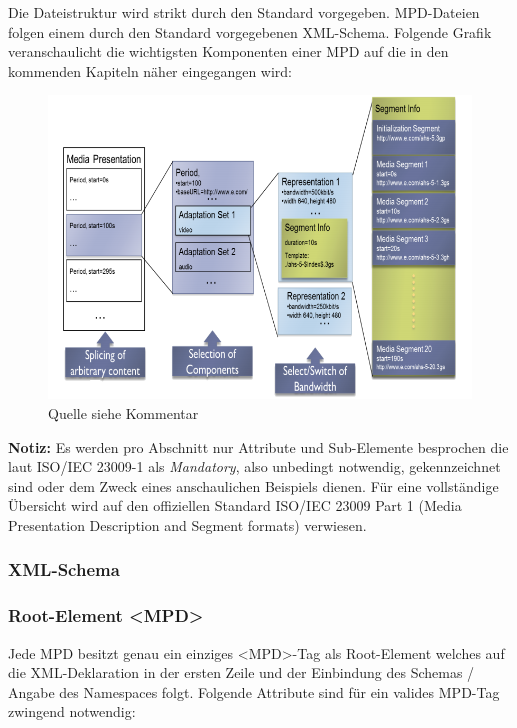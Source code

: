 \documentclass[paper = a4, fontsize = 12pt, parskip = half]{scrartcl} %
\begin{document}
Die Dateistruktur wird strikt durch den Standard vorgegeben. MPD-Dateien folgen einem durch den Standard vorgegebenen XML-Schema. Folgende Grafik veranschaulicht die wichtigsten Komponenten einer MPD auf die in den kommenden Kapiteln näher eingegangen wird:

\begin{center}
    \begin{figure}[h!]
        \includegraphics[width=12cm]{images/mpd-structure.png}
        \caption{Quelle siehe Kommentar}
    \end{figure}
\end{center}

\textbf{Notiz:} Es werden pro Abschnitt nur Attribute und Sub-Elemente besprochen die laut ISO/IEC 23009-1 als \textit{Mandatory}, also unbedingt notwendig, gekennzeichnet sind oder dem Zweck eines anschaulichen Beispiels dienen. Für eine vollständige Übersicht wird auf den offiziellen Standard ISO/IEC 23009 Part 1 (Media Presentation Description and Segment formats) verwiesen.

\subsubsection{XML-Schema}

\subsubsection{Root-Element <MPD>}
Jede MPD besitzt genau ein einziges <MPD>-Tag als Root-Element welches auf die XML-Deklaration in der ersten Zeile und der Einbindung des Schemas / Angabe des Namespaces folgt. 
Folgende Attribute sind für ein valides MPD-Tag zwingend notwendig:
\end{document}
